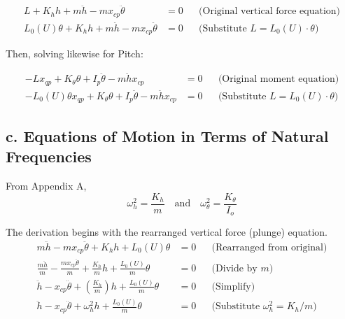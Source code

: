 \documentclass{article}
\begin{document}
\begin{align}
    L + K_h h + m \ddot{h} - m x_{cp} \ddot{\theta} &= 0 && \text{(Original vertical force equation)} \label{eq:vertical_original} \\
    L_0(U) \theta + K_h h + m \ddot{h} - m x_{cp} \ddot{\theta} &= 0 && \text{(Substitute } L = L_0(U) \cdot \theta\text{)} \label{eq:vertical_linear}%
\end{align}

\noindent Then, solving likewise for Pitch:

\begin{align}
    -L x_{qp} + K_{\theta} \theta + I_p \ddot{\theta} - m \ddot{h} x_{cp} &= 0      && \text{(Original moment equation)} \label{eq:moment_original} \\
    -L_0(U) \theta x_{qp} + K_{\theta} \theta + I_p \ddot{\theta} - m \ddot{h} x_{cp} &= 0 && \text{(Substitute } L = L_0(U) \cdot \theta\text{)} \label{eq:moment_linear}%
\end{align}

\newpage
\subsection{c. Equations of Motion in Terms of Natural Frequencies}

From Appendix A, 
\begin{equation}
\omega_h^2 = \frac{K_h}{m} \quad \text{and} \quad \omega_\theta^2 = \frac{K_\theta}{I_o}
\label{eq:natural_frequencies}
\end{equation}

\noindent The derivation begins with the rearranged vertical force (plunge) equation.
\begin{align}
    m \ddot{h} - m x_{cp} \ddot{\theta} + K_h h + L_0(U) \theta &= 0                      && \text{(Rearranged from original)} \label{eq:plunge_rearranged} \\
    \frac{m \ddot{h}}{m} - \frac{m x_{cp} \ddot{\theta}}{m} + \frac{K_h}{m} h + \frac{L_0(U)}{m} \theta &= 0 && \text{(Divide by } m\text{)} \label{eq:plunge_divided} \\
    \ddot{h} - x_{cp} \ddot{\theta} + \left(\frac{K_h}{m}\right) h + \frac{L_0(U)}{m} \theta &= 0         && \text{(Simplify)} \label{eq:plunge_simplified} \\
    \ddot{h} - x_{cp} \ddot{\theta} + \omega_h^2 h + \frac{L_0(U)}{m} \theta &= 0         && \text{(Substitute } \omega_h^2 = K_h/m\text{)} \label{eq:plunge_frequency_form}%
\end{align}
\end{document}
